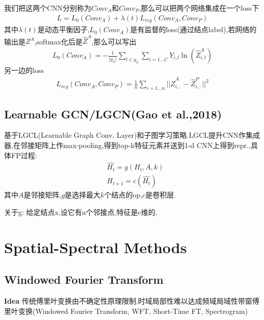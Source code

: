 \documentclass{article}
\begin{document}
我们把这两个CNN分别称为$Conv_A$和$Conv_P$,那么可以把两个网络集成在一个loss下
\begin{align}
    L=L_0(Conv_A)+\lambda(t) L_{reg}(Conv_A,Conv_P)
\end{align}其中$\lambda(t)$是动态平衡因子,$L_0(Conv_A)$是有监督的loss(通过结点label),若网络的输出是$Z^A$,softmax化后是$\widehat Z^A$,那么可以写出
\begin{align}
    L_0(Conv_A)=-\frac{1}{|y_L|}\sum_{l\in y_L}\sum_{i=1\dots C} Y_{i,l}\ln\left(\widehat Z^A_{i,l}\right)
\end{align}
另一边的loss
\begin{align}
    L_{reg}(Conv_A,Conv_P)=\frac{1}{n}\sum_{i=1\dots n}||\widehat Z^A_{i,:}-\widehat Z^P_{i,:}||^2
\end{align}

\subsection{Learnable GCN/LGCN(Gao et al.,2018)}

 基于LGCL(Learnable Graph Conv. Layer)和子图学习策略.LGCL提升CNN作集成器,在邻接矩阵上作max-pooling,得到top-k特征元素并送到1-d CNN上得到repr.,具体FP过程:
\begin{align}
    &\widehat{H_t}=g(H_t,A,k)\\
    &{H_{t+1}}=c(\widehat{H_t})
\end{align}
其中$A$是邻接矩阵,$g$是选择最大$k$个结点的op,$c$是卷积层.

关于g: 给定结点x,设它有n个邻接点,特征是c维的,

\section{Spatial-Spectral Methods}

\subsection{Windowed Fourier Transform}

\textbf{Idea} 传统傅里叶变换由不确定性原理限制,时域局部性\tRarr 难以达成频域局域性\tRarr 带窗傅里叶变换(Windowed Fourier Transform, WFT, Short-Time FT, Spectrogram)
\end{document}
